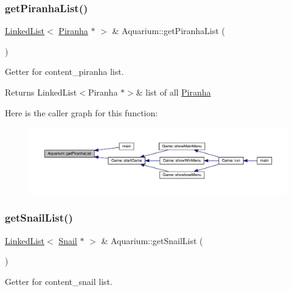 \subsubsection{\texorpdfstring{get\+Piranha\+List()}{getPiranhaList()}}
{\footnotesize\ttfamily \mbox{\hyperlink{class_linked_list}{Linked\+List}}$<$ \mbox{\hyperlink{class_piranha}{Piranha}} $\ast$ $>$ \& Aquarium\+::get\+Piranha\+List (\begin{DoxyParamCaption}{ }\end{DoxyParamCaption})}



Getter for content\+\_\+piranha list. 

\begin{DoxyReturn}{Returns}
Linked\+List$<$\+Piranha $\ast$$>$\& list of all \mbox{\hyperlink{class_piranha}{Piranha}} 
\end{DoxyReturn}
Here is the caller graph for this function\+:
\nopagebreak
\begin{figure}[H]
\begin{center}
\leavevmode
\includegraphics[width=350pt]{class_aquarium_a46c1697b25884c5a91f7a942ae5b3ba7_icgraph}
\end{center}
\end{figure}
\mbox{\label{class_aquarium_a278a38d4cf238908c4e3e170ea66841f}} 
\subsubsection{\texorpdfstring{get\+Snail\+List()}{getSnailList()}}
{\footnotesize\ttfamily \mbox{\hyperlink{class_linked_list}{Linked\+List}}$<$ \mbox{\hyperlink{class_snail}{Snail}} $\ast$ $>$ \& Aquarium\+::get\+Snail\+List (\begin{DoxyParamCaption}{ }\end{DoxyParamCaption})}



Getter for content\+\_\+snail list. 

